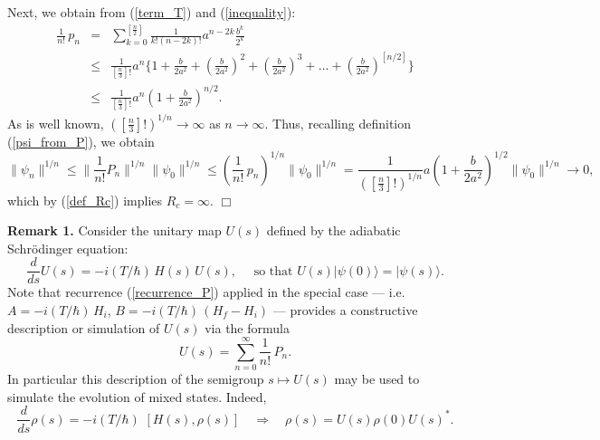 \documentclass[11 pt]{article}
\begin{document}
 Next,  we obtain from (\ref{term_T}) and (\ref{inequality}):
 \begin{equation}\label{term_T_est}
 \begin{array}{lll}
 \frac{1}{n!} \, p_n &=& \sum\limits_{k=0}^{[\frac{n}{2}]}\frac{1}{k!(n-2k)!} a^{n-2k}\frac{b^k}{2^k} \\
 & \leq & \frac{1}{\left[\frac{n}{3}\right]!}a^n\{1 + \frac{b}{2a^2} + \left(\frac{b}{2a^2}\right)^2  + \left(\frac{b}{2a^2}\right)^3 +\ldots + \left(\frac{b}{2a^2}\right)^{[n/2]}\} \\
 & \leq & \frac{1}{\left[\frac{n}{3}\right]!} a^n (1+ \frac{b}{2a^2})^{n/2}.
 \end{array}
\end{equation}
 As is well known, $\left(\left[\frac{n}{3}\right]!\right) ^{1/n} \rightarrow \infty$ as $n\rightarrow \infty$. Thus, recalling definition (\ref{psi_from_P}), we obtain
 \[
 \|\psi_n\|^{1/n} \leq \|\frac{1}{n!}P_n\|^{1/n} \|\psi_0\|^{1/n}\leq \left(\frac{1}{n!}\,p_n\right)^{1/n} \|\psi_0\|^{1/n} =
 \frac{1}{\left(\left[\frac{n}{3}\right]!\right)^{1/n}} a\left(1+ \frac{b}{2a^2}\right)^{1/2} \|\psi_0\|^{1/n}\rightarrow 0,
 \]
 which by (\ref{def_Rc}) implies $R_c = \infty$. $\Box$

 \vspace*{.2cm}

\noindent
\textbf{Remark 1.} Consider the unitary map $U(s)$ defined by the adiabatic Schr\"{o}dinger equation:
\[
\frac{d}{ds} U(s) = -i(T/\hbar)\, H(s)\, U(s), \quad \mbox{ so that } U(s)|\psi (0)\rangle = |\psi (s)\rangle.
\]
Note that recurrence (\ref{recurrence_P}) applied in the special case --- i.e. $A = -i(T/\hbar)\,H_i$, $B=-i(T/\hbar)\,(H_f-H_i)$ --- provides a constructive description or simulation of $U(s)$ via the formula
\[
U(s) = \sum\limits_{n=0}^\infty \frac{1}{n!}\, P_n.
\]
In particular this description of the semigroup $s\mapsto U(s)$ may be used to simulate the evolution of mixed states. Indeed,
 \begin{equation}\label{Schr_rho}
\frac{d}{ds} \rho(s)= -i(T/\hbar)\, \, [H(s), \rho(s) ]\quad \Longrightarrow\quad \rho(s) = U(s)\rho(0) U(s)^*.
 \end{equation}
  \vspace*{.2cm}
\end{document}
